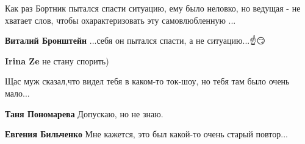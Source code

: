 \begin{itemize}
\begin{itemize}
Как раз Бортник пытался спасти ситуацию, ему было неловко, но ведущая - не хватает слов, чтобы охарактеризовать эту самовлюбленную ...

 
\textbf{Виталий Бронштейн}
...себя он пытался спасти, а не ситуацию...☝️😏

 
\textbf{Irina Ze} не стану спорить)

\end{itemize}

 
Щас муж сказал,что видел тебя в каком-то ток-шоу, но тебя там было очень мало...

\begin{itemize}
 
\textbf{Таня Пономарева} Допускаю, но не знаю.

 
\textbf{Евгения Бильченко} Мне кажется, это был какой-то очень старый повтор...
\end{itemize}

 

\end{itemize}
